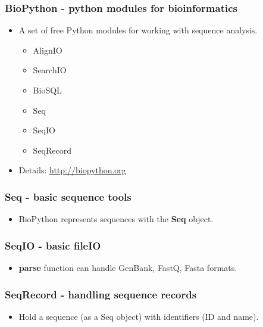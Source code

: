 \documentclass[11pt]{beamer}
\begin{document}
\begin{frame}[plain]
    \frametitle{BioPython - python modules for bioinformatics}
    \begin{itemize}
        \item[] A set of free Python modules for working with sequence analysis.
        \newline
        \begin{itemize}
            \item[] AlignIO 
            \item[] SearchIO
            \item[] BioSQL
            \item[] Seq
            \item[] SeqIO
            \item[] SeqRecord
            \newline
        \end{itemize}
        \item[] Details: \url{http://biopython.org}
    \end{itemize}
\end{frame}
%
\begin{frame}[plain]
    \frametitle{Seq - basic sequence tools}
    \begin{itemize}
        \item[]  BioPython represents sequences with the \textbf{Seq} object. 
        \newline
        
    \end{itemize}
\end{frame}
%
\begin{frame}[plain]
    \frametitle{SeqIO - basic fileIO}
    \begin{itemize}
        \item[] \textbf{parse} function can handle GenBank, FastQ, Fasta formats.  
        \newline
        
        
    \end{itemize}
\end{frame}
%
\begin{frame}[plain]
    \frametitle{SeqRecord - handling sequence records}
    \begin{itemize}
        \item[] Hold a sequence (as a Seq object) with identifiers (ID and name).
        
    \end{itemize}
\end{frame}
\end{document}
